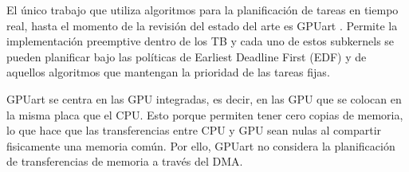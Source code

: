 
El único trabajo que utiliza algoritmos para la planificación de tareas en tiempo real, hasta el momento de la revisión del estado del arte es GPUart \cite{GPUArt}. Permite la implementación preemptive dentro de los TB y cada uno de estos subkernels se pueden planificar bajo las políticas de Earliest Deadline First (EDF) y de aquellos algoritmos que mantengan la prioridad de las tareas fijas.

\vspace{0.3cm}

GPUart se centra en las GPU integradas, es decir, en las GPU que se colocan en la misma placa que el CPU. Esto porque permiten tener cero copias de memoria, lo que hace que las transferencias entre CPU y GPU sean nulas al compartir fisicamente una memoria común. Por ello, GPUart no considera la planificación de transferencias de memoria a través del DMA.
 
 	

